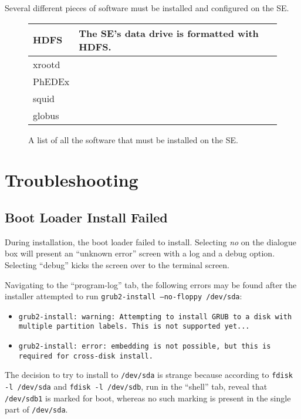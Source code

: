 \documentclass[12pt]{article}
\begin{document}
\qq Several different pieces of software must be installed and configured on the
SE.

\begin{figure}[H]
  \caption{A list of all the software that must be installed on the SE.}
  \begin{center}
    \begin{tabular}{|l|l|}
      \hline
      HDFS & The SE's data drive is formatted with HDFS. \\
      \hline
      xrootd & \\
      PhEDEx & \\
      squid & \\
      globus & \\
    \end{tabular}
  \end{center}
\end{figure}



\section{Troubleshooting}

\subsection{Boot Loader Install Failed}

\qq During installation, the boot loader failed to install. Selecting
\textit{no} on the dialogue box will present an ``unknown error'' screen with a
log and a debug option. Selecting ``debug'' kicks the screen over to the
terminal screen.

\qq Navigating to the ``program-log'' tab, the following errors may be found
after the installer attempted to run {\tt grub2-install --no-floppy /dev/sda}:

\begin{itemize}
\item {\tt grub2-install: warning: Attempting to install GRUB to a disk with multiple
    partition labels. This is not supported yet...}
\item {\tt grub2-install: error: embedding is not possible, but this is required
    for cross-disk install.}
\end{itemize}

The decision to try to install to {\tt /dev/sda} is strange because according to
{\tt fdisk -l /dev/sda} and {\tt fdisk -l /dev/sdb}, run in the ``shell'' tab,
reveal that {\tt /dev/sdb1} is marked for boot, whereas no such marking is
present in the single part of {\tt /dev/sda}.
\end{document}
